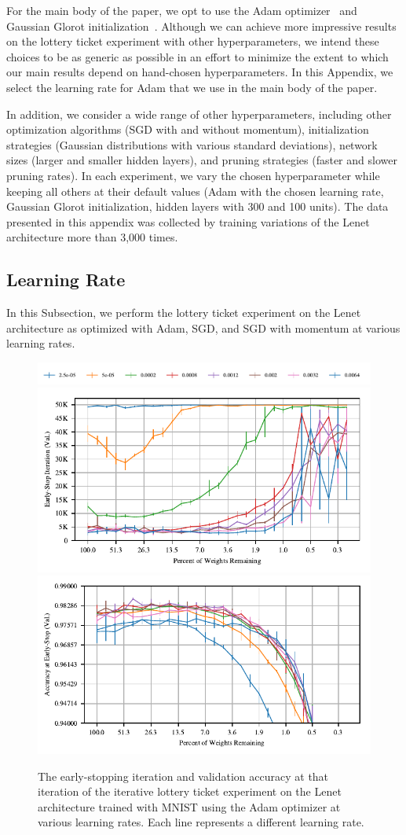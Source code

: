 For the main body of the paper, we opt to use the Adam optimizer~\citep{adam} and Gaussian Glorot initialization~\citep{xavier}. Although we can achieve more
impressive results on the lottery ticket experiment with other hyperparameters, we intend these
choices to be as generic as possible in an effort to minimize the extent to which our main results depend on hand-chosen hyperparameters. In this Appendix,
we select the learning rate for Adam that we use in the main body of the paper.

In addition, we consider a wide range of other hyperparameters, including
other optimization algorithms (SGD with and without momentum), initialization strategies (Gaussian distributions with various standard deviations),
network sizes (larger and smaller hidden layers), and pruning strategies (faster and slower pruning rates). In each experiment, we vary the chosen
hyperparameter while keeping all others at their default values (Adam with the chosen learning rate, Gaussian Glorot initialization, hidden layers
with 300 and 100 units). The data presented in this appendix was collected by training variations of the Lenet architecture more than 3,000 times.

\subsection{Learning Rate}

In this Subsection, we perform the lottery ticket experiment on the Lenet architecture as optimized with Adam, SGD, and SGD with momentum at various
learning rates.

\begin{figure}
\centering
\includegraphics[width=.7\textwidth]{graphs/mnist/lenet/adam_rate_sweep/legend}
\includegraphics[width=.5\textwidth]{graphs/mnist/lenet/adam_rate_sweep/iteration}%
\includegraphics[width=.5\textwidth]{graphs/mnist/lenet/adam_rate_sweep/accuracy}
\caption{The early-stopping iteration and validation accuracy at that iteration of the iterative lottery ticket experiment on the Lenet architecture trained with MNIST using
the Adam optimizer at various learning rates. Each line represents a different learning rate.}
\label{fig:appendix-adam}
\end{figure}

